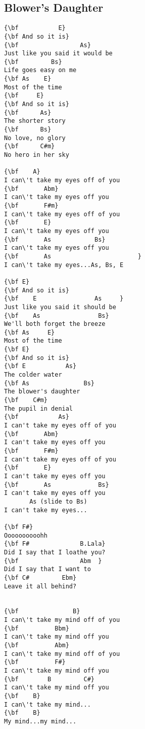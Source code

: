 \documentclass[a4paper]{article}
\begin{document}
\subsection{Blower's Daughter} %
\label{sub:Blower's Daugther}
\begin{Verbatim}[commandchars=\\\{\}]
{\bf           E}
{\bf And so it is}
{\bf 	             As}
Just like you said it would be
{\bf 	     Bs}
Life goes easy on me
{\bf As	   E}
Most of the time
{\bf     E}
{\bf And so it is}
{\bf 	  As}
The shorter story
{\bf 	  Bs}
No love, no glory
{\bf 	  C#m}
No hero in her sky

{\bf 	A}
I can\'t take my eyes off of you
{\bf 	   Abm}
I can\'t take my eyes off you
{\bf 	   F#m}
I can\'t take my eyes off of you
{\bf 	   E}
I can\'t take my eyes off you
{\bf 	   As            Bs}
I can\'t take my eyes off you
{\bf 	   As                        }
I can\'t take my eyes...As, Bs, E

{\bf E}
{\bf And so it is}
{\bf 	E                As     }
Just like you said it should be
{\bf 	As                Bs}
We'll both forget the breeze
{\bf As	    E}
Most of the time
{\bf E}
{\bf And so it is}
{\bf E	         As}
The colder water
{\bf As	              Bs}
The blower's daughter
{\bf 	C#m}
The pupil in denial
{\bf           As}
I can't take my eyes off of you
{\bf 	   Abm}
I can't take my eyes off you
{\bf 	   F#m}
I can't take my eyes off of you
{\bf 	   E}
I can't take my eyes off you
{\bf 	   As             Bs}
I can't take my eyes off you
	   As (slide to Bs)                      
I can't take my eyes...

{\bf F#}
Oooooooooohh
{\bf F#              B.Lala}
Did I say that I loathe you?
{\bf                 Abm  }
Did I say that I want to
{\bf C#	        Ebm}
Leave it all behind?


{\bf               B}
I can\'t take my mind off of you
{\bf 	      Bbm}
I can\'t take my mind off you
{\bf 	      Abm}
I can\'t take my mind off of you
{\bf 	      F#}
I can\'t take my mind off you
{\bf 	    B         C#}
I can\'t take my mind off you
{\bf 	B}
I can\'t take my mind...
{\bf 	B}
My mind...my mind...
\end{Verbatim}
\newpage
\end{document}
